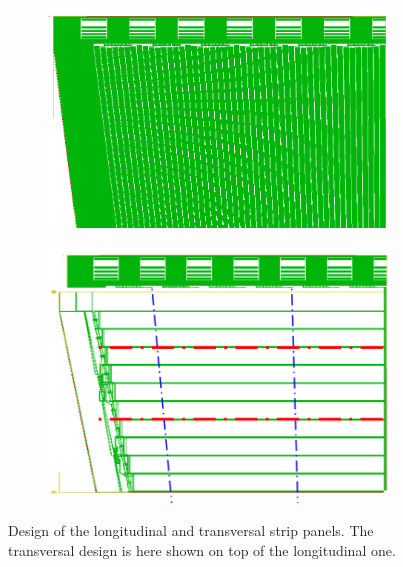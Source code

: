 	\begin{figure}[H]
		\begin{subfigure}{.5\linewidth}
		    \centering
			\includegraphics[width = \linewidth]{fig/chapt6/INFN-FEB-Longitudinal-Drawing.png}
			\caption{\label{fig:INFN_Readout:A}}
		\end{subfigure}
		\begin{subfigure}{.5\linewidth}
		    \centering
			\includegraphics[width = \linewidth]{fig/chapt6/INFN-FEB-Transversal-Drawing.png}
			\caption{\label{fig:INFN_Readout:B}}
		\end{subfigure}
		\caption{\label{fig:INFN_Readout} Design of the longitudinal  and transversal  strip panels. The transversal design is here shown on top of the longitudinal one.}
    \end{figure}
    
